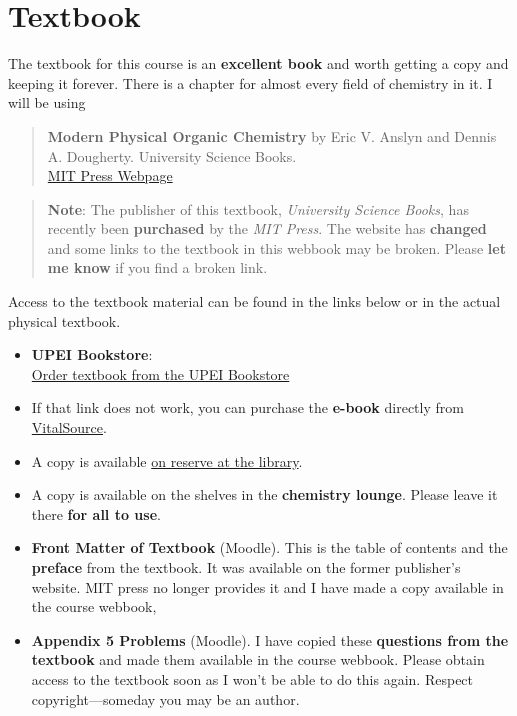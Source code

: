 \newpage
\section{Textbook}

The textbook for this course is an \textbf{excellent book} and worth getting a copy and keeping it forever. There is a chapter for almost every field of chemistry in it. I will be using

\begin{quote}
\textbf{Modern Physical Organic Chemistry} by Eric V. Anslyn and Dennis A. Dougherty. University Science Books.\\
\href{https://mitpress.mit.edu/9781891389313/modern-physical-organic-chemistry/}{MIT Press Webpage}
\end{quote}




\begin{quote}
\textbf{Note}: The publisher of this textbook, \textit{University Science Books}, has recently been \textbf{purchased} by the \textit{MIT Press}. The website has \textbf{changed} and some links to the textbook in this webbook may be broken. Please \textbf{let me know} if you find a broken link.
\end{quote}

Access to the textbook material can be found in the links below or in the actual physical textbook.

\begin{itemize}
\item \textbf{UPEI Bookstore}:\\
\href{https://upei.bookware3000.ca/CourseSearch/?course[]=1,2025F,CHEM,CHEM441001,}{Order textbook from the UPEI Bookstore}

\item If that link does not work, you can purchase the \textbf{e-book} directly from\\
\href{https://www.vitalsource.com/en-ca/products/modern-physical-organic-chemistry-eric-v-anslyn-dennis-a-v9781891389306}{VitalSource}.

\item A copy is available \href{https://libraryupei.ca/chemistry-4410-physical-organic-chemistry-fall-2025}{on reserve at the library}.

\item A copy is available on the shelves in the \textbf{chemistry lounge}. Please leave it there \textbf{for all to use}.

\item \textbf{Front Matter of Textbook} (Moodle). This is the table of contents and the \textbf{preface} from the textbook. It was available on the former publisher's website. MIT press no longer provides it and I have made a copy available in the course webbook,

\item \textbf{Appendix 5 Problems} (Moodle). I have copied these \textbf{questions from the textbook} and made them available in the course webbook. Please obtain access to the textbook soon as I won't be able to do this again. Respect copyright---someday you may be an author.
\end{itemize}

